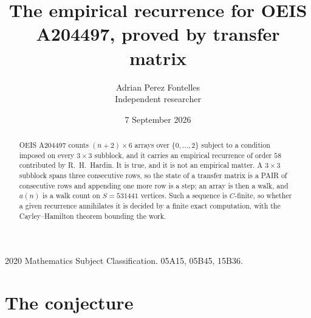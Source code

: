 \documentclass[11pt,a4paper]{article}
\title{The empirical recurrence for OEIS A204497, proved by transfer matrix}
\author{Adrian Perez Fontelles\\ \small Independent researcher}
\date{7 September 2026}
\theoremstyle{plain}
\theoremstyle{definition}
\begin{document}
\maketitle

\begin{abstract}
OEIS A204497 counts $(n+2)\times6$ arrays over $\{0,\dots,2\}$ subject to a condition imposed on
every $3\times3$ subblock, and it carries an empirical recurrence of order $58$
contributed by R.~H.~Hardin. It is true, and it is not an empirical matter. A $3\times3$
subblock spans three consecutive rows, so the state of a transfer matrix is a PAIR of
consecutive rows and appending one more row is a step; an array is then a walk, and
$a(n)$ is a walk count on $S=531441$ vertices. Such a sequence is $C$-finite, so whether a given
recurrence annihilates it is decided by a finite exact computation, with the Cayley--Hamilton
theorem bounding the work.
\end{abstract}

\noindent\small 2020 Mathematics Subject Classification. 05A15, 05B45, 15B36.\normalsize

\section{The conjecture}
\end{document}
